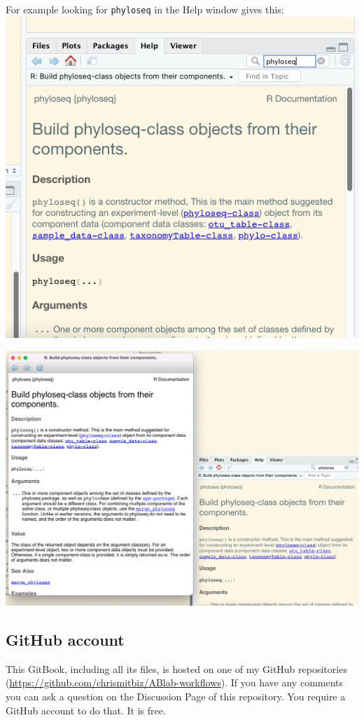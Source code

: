 \documentclass[
]{book}
\begin{document}
For example looking for \texttt{phyloseq} in the Help window gives this:\\
\includegraphics{./img/helpR1.png}

\includegraphics{./img/helpR.png}

\hypertarget{github-account}{%
\subsection{GitHub account}\label{github-account}}

This GitBook, including all its files, is hosted on one of my GitHub repositories (\url{https://github.com/chrismitbiz/ABlab-workflows}). If you have any comments you can ask a question on the Discussion Page of this repository. You require a GitHub account to do that. It is free.
\end{document}
